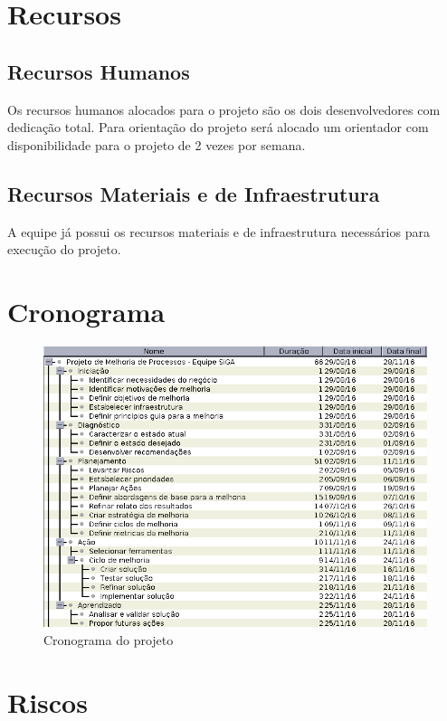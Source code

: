 \section*{Recursos}

\subsection*{Recursos Humanos}

	Os recursos humanos alocados para o projeto são os dois desenvolvedores com dedicação total. Para orientação do projeto será alocado um orientador com disponibilidade para o projeto de 2 vezes por semana.


\subsection*{Recursos Materiais e de Infraestrutura}

	A equipe já possui os recursos materiais e de infraestrutura necessários para execução do projeto.

\section*{Cronograma}

\begin{figure}[!ht]
\centering
\includegraphics[scale=0.7]{figuras/cronograma.png}
\caption{Cronograma do projeto}
\label{fig:cronograma}
\end{figure}

\section*{Riscos}
  
